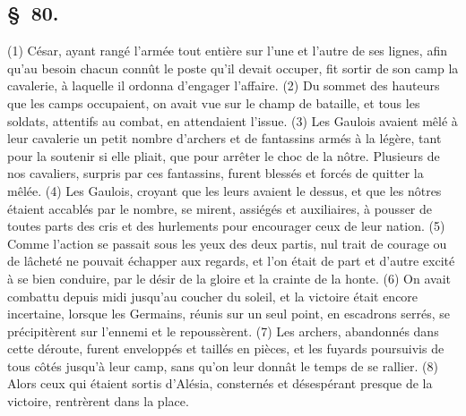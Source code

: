 \documentclass[french,twoside]{book} %
\begin{document}
\subsection[{§ 80.}]{ \textsc{§ 80.} }
\noindent (1) César, ayant rangé l’armée tout entière sur l’une et l’autre de ses lignes, afin qu’au besoin chacun connût le poste qu’il devait occuper, fit sortir de son camp la cavalerie, à laquelle il ordonna d’engager l’affaire. (2) Du sommet des hauteurs que les camps occupaient, on avait vue sur le champ de bataille, et tous les soldats, attentifs au combat, en attendaient l’issue. (3) Les Gaulois avaient mêlé à leur cavalerie un petit nombre d’archers et de fantassins armés à la légère, tant pour la soutenir si elle pliait, que pour arrêter le choc de la nôtre. Plusieurs de nos cavaliers, surpris par ces fantassins, furent blessés et forcés de quitter la mêlée. (4) Les Gaulois, croyant que les leurs avaient le dessus, et que les nôtres étaient accablés par le nombre, se mirent, assiégés et auxiliaires, à pousser de toutes parts des cris et des hurlements pour encourager ceux de leur nation. (5) Comme l’action se passait sous les yeux des deux partis, nul trait de courage ou de lâcheté ne pouvait échapper aux regards, et l’on était de part et d’autre excité à se bien conduire, par le désir de la gloire et la crainte de la honte. (6) On avait combattu depuis midi jusqu’au coucher du soleil, et la victoire était encore incertaine, lorsque les Germains, réunis sur un seul point, en escadrons serrés, se précipitèrent sur l’ennemi et le repoussèrent. (7) Les archers, abandonnés dans cette déroute, furent enveloppés et taillés en pièces, et les fuyards poursuivis de tous côtés jusqu’à leur camp, sans qu’on leur donnât le temps de se rallier. (8) Alors ceux qui étaient sortis d’Alésia, consternés et désespérant presque de la victoire, rentrèrent dans la place.
\end{document}

